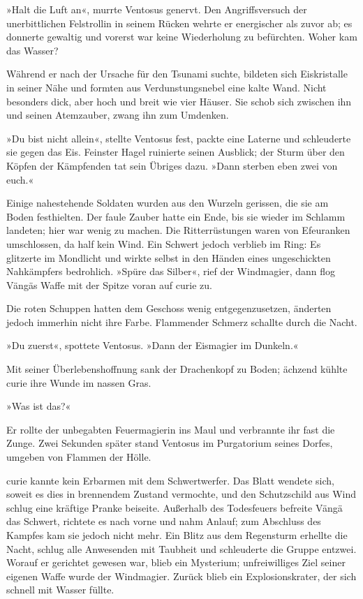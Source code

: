 »Halt die Luft an«, murrte Ventosus genervt. Den Angriffsversuch der unerbittlichen Felstrollin in seinem Rücken wehrte er energischer als zuvor ab; es donnerte gewaltig und vorerst war keine Wiederholung zu befürchten. Woher kam das Wasser?

Während er nach der Ursache für den Tsunami suchte, bildeten sich Eiskristalle in seiner Nähe und formten aus Verdunstungsnebel eine kalte Wand. Nicht besonders dick, aber hoch und breit wie vier Häuser. Sie schob sich zwischen ihn und seinen Atemzauber, zwang ihn zum Umdenken.

»Du bist nicht allein«, stellte Ventosus fest, packte eine Laterne und schleuderte sie gegen das Eis. Feinster Hagel ruinierte seinen Ausblick; der Sturm über den Köpfen der Kämpfenden tat sein Übriges dazu. »Dann sterben eben zwei von euch.«

Einige nahestehende Soldaten wurden aus den Wurzeln gerissen, die sie am Boden festhielten. Der faule Zauber hatte ein Ende, bis sie wieder im Schlamm landeten; hier war wenig zu machen. Die Ritterrüstungen waren von Efeuranken umschlossen, da half kein Wind. Ein Schwert jedoch verblieb im Ring: Es glitzerte im Mondlicht und wirkte selbst in den Händen eines ungeschickten Nahkämpfers bedrohlich. »Spüre das Silber«, rief der Windmagier, dann flog Vängäs Waffe mit der Spitze voran auf curie zu.

Die roten Schuppen hatten dem Geschoss wenig entgegenzusetzen, änderten jedoch immerhin nicht ihre Farbe. Flammender Schmerz schallte durch die Nacht.

»Du zuerst«, spottete Ventosus. »Dann der Eismagier im Dunkeln.«

Mit seiner Überlebenshoffnung sank der Drachenkopf zu Boden; ächzend kühlte curie ihre Wunde im nassen Gras.

»Was ist das?«

 Er rollte der unbegabten Feuermagierin ins Maul und verbrannte ihr fast die Zunge. Zwei Sekunden später stand Ventosus im Purgatorium seines Dorfes, umgeben von Flammen der Hölle.

curie kannte kein Erbarmen mit dem Schwertwerfer. Das Blatt wendete sich, soweit es dies in brennendem Zustand vermochte, und den Schutzschild aus Wind schlug eine kräftige Pranke beiseite. Außerhalb des Todesfeuers befreite Vängä das Schwert, richtete es nach vorne und nahm Anlauf; zum Abschluss des Kampfes kam sie jedoch nicht mehr. Ein Blitz aus dem Regensturm erhellte die Nacht, schlug alle Anwesenden mit Taubheit und schleuderte die Gruppe entzwei. Worauf er gerichtet gewesen war, blieb ein Mysterium; unfreiwilliges Ziel seiner eigenen Waffe wurde der Windmagier. Zurück blieb ein Explosionskrater, der sich schnell mit Wasser füllte.

